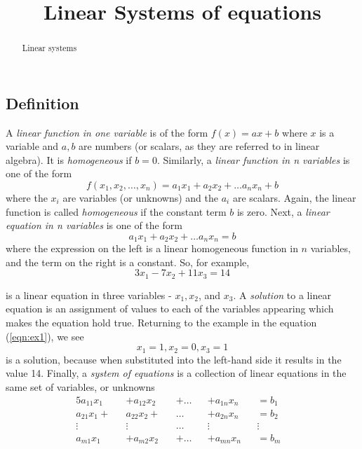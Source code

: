 \documentclass{ximera}
\title{Linear Systems of equations}
\begin{document}
\begin{abstract}
  Linear systems
\end{abstract}

\maketitle


\subsection{Definition} A {\it linear function in one variable} is of the form $f(x) = ax+b$ where $x$ is a variable and $a,b$ are numbers (or scalars, as they are referred to in linear algebra). It is {\it homogeneous} if $b=0$. Similarly, a {\it linear function in n variables} is one of the form
\[
f(x_1,x_2,\dots,x_n) = a_1x_1 + a_2x_2 + \dots a_nx_n + b
\]
where the $x_i$ are variables (or unknowns) and the $a_i$ are scalars. Again, the linear function is called {\it homogeneous} if the constant term $b$ is zero. Next, a {\it linear equation in n variables} is one of the form
\[
a_1x_1 + a_2x_2 + \dots a_nx_n =  b
\]
where the expression on the left is a linear homogeneous function in $n$ variables, and the term on the right is a constant. So, for example, 
\begin{equation}\label{eqn:ex1}
3x_1 - 7x_2 + 11x_3 = 14
\end{equation}

is a linear equation in three variables - $x_1, x_2$, and $x_3$. A {\it solution} to a linear equation is an assignment of values to each of the variables appearing which makes the equation hold true. Returning to the example in the equation (\ref{eqn:ex1}), we see
\[
x_1 = 1, x_2 = 0, x_3 = 1
\]
is a solution, because when substituted into the left-hand side it results in the value 14. Finally, a {\it system of equations} is a collection of linear equations in the same set of variables, or unknowns
\begin{alignat*}{5}\tag{2.2}\label{eqn:sys}
a_{11}x_1 &&+ a_{12}x_2 && + {}\ldots{} && + a_{1n}x_n && =  b_1 &\\
a_{21}x_1 + && a_{22}x_2 + &&  {}\ldots{} && + a_{2n}x_n &&  = b_2 &\\
\vdots &&  \vdots &&  {}\ldots{} &&  \vdots &&   \vdots &\\
a_{m1}x_1 &&+ a_{m2}x_2 && + {}\ldots{} && + a_{mn}x_n && =  b_m &
\end{alignat*}
\end{document}
